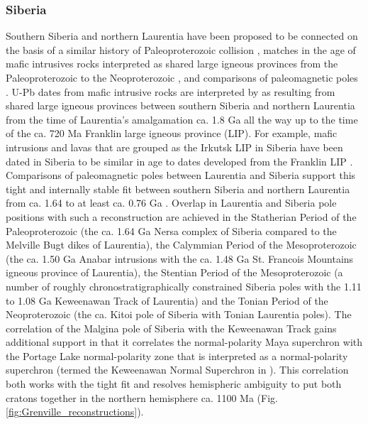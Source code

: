 \documentclass[twocolumn, switch]{article} %
\begin{document}

\subsubsection{Siberia}

Southern Siberia and northern Laurentia have been proposed to be connected on the basis of a similar history of Paleoproterozoic collision \citep{Rainbird1998a}, matches in the age of mafic intrusives rocks interpreted as shared large igneous provinces from the Paleoproterozoic to the Neoproterozoic \cite{Ernst2016a}, and comparisons of paleomagnetic poles \citep{Evans2011a, Evans2016b}. U-Pb dates from mafic intrusive rocks are interpreted by \cite{Ernst2016a} as resulting from shared large igneous provinces between southern Siberia and northern Laurentia from the time of Laurentia's amalgamation ca. 1.8 Ga all the way up to the time of the ca. 720 Ma Franklin large igneous province (LIP). For example, mafic intrusions and lavas that are grouped as the Irkutsk LIP in Siberia have been dated in Siberia to be similar in age to dates developed from the Franklin LIP \citep{Denyszyn2009a, Ernst2016a}. Comparisons of paleomagnetic poles between Laurentia and Siberia support this tight and internally stable fit between southern Siberia and northern Laurentia from ca. 1.64 to at least ca. 0.76 Ga  \citep{Evans2016b}. Overlap in Laurentia and Siberia pole positions with such a reconstruction are achieved in the Statherian Period of the Paleoproterozoic (the ca. 1.64 Ga Nersa complex of Siberia compared to the Melville Bugt dikes of Laurentia), the Calymmian Period of the Mesoproterozoic (the ca. 1.50 Ga Anabar intrusions with the ca. 1.48 Ga St. Francois Mountains igneous province of Laurentia), the Stentian Period of the Mesoproterozoic (a number of roughly chronostratigraphically constrained Siberia poles with the 1.11 to 1.08 Ga Keweenawan Track of Laurentia) and the Tonian Period of the Neoproterozoic (the ca.  Kitoi pole of Siberia with Tonian Laurentia poles).  The correlation of the Malgina pole of Siberia with the Keweenawan Track gains additional support in that it correlates the normal-polarity Maya superchron \citep{Gallet2012a} with the Portage Lake normal-polarity zone \citep{Swanson-Hysell2019a} that is interpreted as a normal-polarity superchron (termed the Keweenawan Normal Superchron in \citealp{Driscoll2016a}). This correlation both works with the tight fit and resolves hemispheric ambiguity to put both cratons together in the northern hemisphere ca. 1100 Ma (Fig. \ref{fig:Grenville_reconstructions}).
\end{document}
